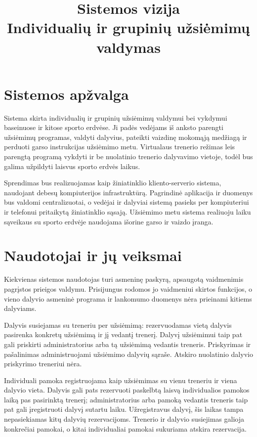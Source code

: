 \documentclass[a4paper,11pt]{article}
\title{Sistemos vizija\\\large Individualių ir grupinių užsiėmimų valdymas}
\begin{document}
\maketitle

\section{Sistemos apžvalga}

Sistema skirta individualių ir grupinių užsiėmimų valdymui bei vykdymui baseinuose ir kitose sporto erdvėse. Ji padės vedėjams iš anksto parengti užsiėmimų programas, valdyti dalyvius, pateikti vaizdinę mokomąją medžiagą ir perduoti garso instrukcijas užsiėmimo metu. Virtualaus trenerio režimas leis parengtą programą vykdyti ir be nuolatinio trenerio dalyvavimo vietoje, todėl bus galima užpildyti laisvus sporto erdvės laikus.

Sprendimas bus realizuojamas kaip žiniatinklio kliento-serverio sistema, naudojant debesų kompiuterijos infrastruktūrą. Pagrindinė aplikacija ir duomenys bus valdomi centralizuotai, o vedėjai ir dalyviai sistemą pasieks per kompiuteriui ir telefonui pritaikytą žiniatinklio sąsają. Užsiėmimo metu sistema realiuoju laiku sąveikaus su sporto erdvėje naudojama išorine garso ir vaizdo įranga.

\section{Naudotojai ir jų veiksmai}

Kiekvienas sistemos naudotojas turi asmeninę paskyrą, apsaugotą vaidmenimis pagrįstos prieigos valdymu. Prisijungus rodomos jo vaidmeniui skirtos funkcijos, o vieno dalyvio asmeninė programa ir lankomumo duomenys nėra prieinami kitiems dalyviams.

Dalyvis susiejamas su treneriu per užsiėmimą: rezervuodamas vietą dalyvis pasirenka konkretų užsiėmimą ir jį vedantį trenerį. Dalyvį užsiėmimui taip pat gali priskirti administratorius arba tą užsiėmimą vedantis treneris. Priskyrimas ir pašalinimas administruojami užsiėmimo dalyvių sąraše. Atskiro nuolatinio dalyvio priskyrimo treneriui nėra.

Individuali pamoka registruojama kaip užsiėmimas su vienu treneriu ir viena dalyvio vieta. Dalyvis gali pats rezervuoti paskelbtą laisvą individualios pamokos laiką pas pasirinktą trenerį; administratorius arba pamoką vedantis treneris taip pat gali įregistruoti dalyvį sutartu laiku. Užregistravus dalyvį, šis laikas tampa nepasiekiamas kitų dalyvių rezervacijoms. Trenerio ir dalyvio susiejimas galioja konkrečiai pamokai, o kitai individualiai pamokai sukuriama atskira rezervacija.
\end{document}
